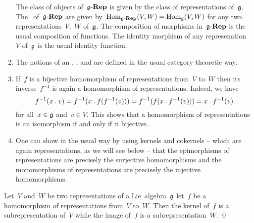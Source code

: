 \begin{remark}
\begin{enumerate}
      The class of objects of~$\mathfrak{g}\text{-}\mathbf{Rep}$ is given by the class of representations of~$\mathfrak{g}$.
      The~\spaces{$\Hom$} of~$\mathfrak{g}\text{-}\mathbf{Rep}$ are given by~$\operatorname{Hom}_{\mathfrak{g}\text{-}\mathbf{Rep}}(V, W) = \operatorname{Hom}_{\mathfrak{g}}(V,W)$ for any two representations~$V$,~$W$ of~$\mathfrak{g}$.
      The composition of morphisms in~$\mathfrak{g}\text{-}\mathbf{Rep}$ is the usual composition of functions.
      The identity morphism of any represenation~$V$ of~$\mathfrak{g}$ is the usual identity function.
    \item
      The notions of an  , ,  and  are defined in the usual category-theoretic way.
    \item
      If~$f$ is a bijective homomorphism of representations from~$V$ to~$W$ then its inverse~$f^{-1}$ is again a homomorphism of representations.
      Indeed, we have
      \[
        f^{-1}(x \mathbin{.} v)
        =
        f^{-1}(x \mathbin{.} f(f^{-1}(v)))
        =
        f^{-1}(f(x \mathbin{.} f^{-1}(v)))
        =
        x \mathbin{.} f^{-1}(v)
      \]
      for all~$x \in \mathfrak{g}$ and~$v \in V$. 
      This shows that a homomorphism of representations is an isomorphism if and only if it bijective.
    \item
      One can show in the usual way by using kernels and cokernels -- which are again representations, as we will see below -- that the epimorphisms of representations are precisely the surjective homomorphisms and the monomorphisms of representations are precisely the injective homomorphisms.
  \end{enumerate}
\end{remark}


\begin{lemma}
  Let~$V$ and~$W$ be two representations of a Lie~algebra~$\mathfrak{g}$ let~$f$ be a homomorphism of representations from~$V$ to~$W$.
  Then the kernel of~$f$ is a subrepresentation of~$V$ while the image of~$f$ is a subrepresentation~$W$.
  \qed
\end{lemma}


